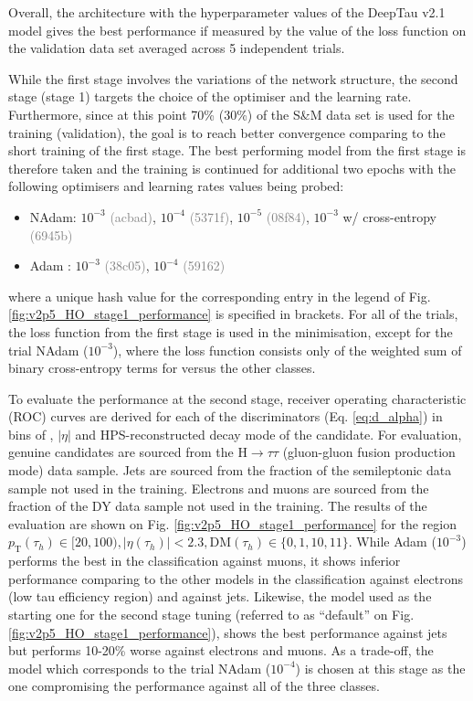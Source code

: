 Overall, the architecture with the hyperparameter values of the DeepTau v2.1 model gives the best performance if measured by the value of the loss function on the validation data set averaged across 5 independent trials.

While the first stage involves the variations of the network structure, the second stage (stage 1) targets the choice of the optimiser and the learning rate. Furthermore, since at this point 70\% (30\%) of the S\&M data set is used for the training (validation), the goal is to reach better convergence comparing to the short training of the first stage. The best performing model from the first stage is therefore taken and the training is continued for additional two epochs with the following optimisers and learning rates values being probed:
\begin{itemize}
    \item NAdam: $10^{-3}$ \textcolor{gray}{(acbad)}, $10^{-4}$ \textcolor{gray}{(5371f)}, $10^{-5}$ \textcolor{gray}{(08f84)}, $10^{-3}$ w/ cross-entropy \textcolor{gray}{(6945b)}
    \item Adam \cite{kingma2014adam}: $10^{-3}$ \textcolor{gray}{(38c05)}, $10^{-4}$ \textcolor{gray}{(59162)}
\end{itemize}

where a unique hash value for the corresponding entry in the legend of Fig. \ref{fig:v2p5_HO_stage1_performance} is specified in brackets. For all of the trials, the loss function from the first stage is used in the minimisation, except for the trial NAdam ($10^{-3}$), where the loss function consists only of the weighted sum of binary cross-entropy terms for \tauh versus the other classes.

To evaluate the performance at the second stage, receiver operating characteristic (ROC) curves are derived for each of the discriminators (Eq. \ref{eq:d_alpha}) in bins of \pt, $|\eta|$ and HPS-reconstructed decay mode of the \tauh candidate. For evaluation, genuine \tauh candidates are sourced from the $\text{H} \to \tau\tau$ (gluon-gluon fusion production mode) data sample. Jets are sourced from the fraction of the semileptonic \ttbar data sample not used in the training. Electrons and muons are sourced from the fraction of the DY data sample not used in the training. The results of the evaluation are shown on Fig. \ref{fig:v2p5_HO_stage1_performance} for the region $p_\text{T}(\tau_h) \in [20,100), |\eta(\tau_h)| < 2.3, \text{DM}(\tau_h) \in \{0,1,10,11\}$. While Adam ($10^{-3}$) performs the best in the classification against muons, it shows inferior performance comparing to the other models in the classification against electrons (low tau efficiency region) and against jets. Likewise, the model used as the starting one for the second stage tuning (referred to as \enquote{default} on Fig. \ref{fig:v2p5_HO_stage1_performance}), shows the best performance against jets but performs 10-20\% worse against electrons and muons. As a trade-off, the model which corresponds to the trial NAdam ($10^{-4}$) is chosen at this stage as the one compromising the performance against all of the three classes.

